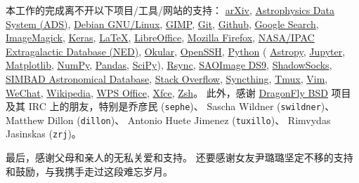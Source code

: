 \begin{thanks}
本工作的完成离不开以下项目/工具/网站的支持：
\href{https://arxiv.org/}{arXiv},
\href{http://ads.harvard.edu/}{Astrophysics Data System (ADS)},
\href{https://www.debian.org/}{Debian GNU/Linux},
\href{https://www.gimp.org/}{GIMP},
\href{https://git-scm.com/}{Git},
\href{https://github.com/}{Github},
\href{https://www.google.com/}{Google Search},
\href{https://imagemagick.org/}{ImageMagick},
\href{https://keras.io/}{Keras},
\href{https://www.latex-project.org/}{\LaTeX},
\href{https://www.libreoffice.org/}{LibreOffice},
\href{https://www.mozilla.org/en-US/firefox/}{Mozilla Firefox},
\href{https://ned.ipac.caltech.edu/}{NASA/IPAC Extragalactic Database (NED)},
\href{https://okular.kde.org/}{Okular},
\href{https://www.openssh.com/}{OpenSSH},
\href{https://www.python.org/}{Python} (%
\href{https://www.astropy.org/}{Astropy},
\href{https://jupyter.org/}{Jupyter},
\href{https://matplotlib.org/}{Matplotlib},
\href{https://www.numpy.org/}{NumPy},
\href{https://pandas.pydata.org/}{Pandas},
\href{https://scipy.org/}{SciPy}),
\href{https://rsync.samba.org/}{Rsync},
\href{http://ds9.si.edu/}{SAOImage DS9},
\href{https://shadowsocks.org/}{ShadowSocks},
\href{http://simbad.u-strasbg.fr/simbad/}{SIMBAD Astronomical Database},
\href{https://stackoverflow.com/}{Stack Overflow},
\href{https://syncthing.net/}{Syncthing},
\href{https://github.com/tmux/tmux}{Tmux},
\href{https://www.vim.org/}{Vim},
\href{https://www.wechat.com/}{WeChat},
\href{https://www.wikipedia.org/}{Wikipedia},
\href{http://wps-community.org/}{WPS Office},
\href{https://www.xfce.org/}{Xfce},
\href{http://www.zsh.org/}{Zsh}。
此外，感谢 \href{https://www.dragonflybsd.org/}{DragonFly BSD}
项目及其 IRC 上的朋友，特别是乔彦民 (\texttt{sephe})、
Sascha Wildner (\texttt{swildner})、
Matthew Dillon (\texttt{dillon})、
Antonio Huete Jimenez (\texttt{tuxillo})、
Rimvydas Jasinskas (\texttt{zrj})。

最后，感谢父母和亲人的无私关爱和支持。
还要感谢女友尹璐璐坚定不移的支持和鼓励，与我携手走过这段难忘岁月。

\end{thanks}
